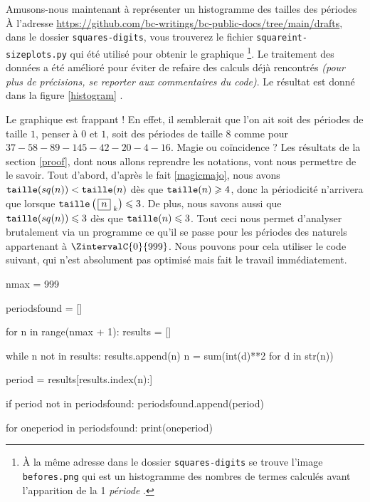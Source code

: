 \medskip

Amusons-nous maintenant à représenter un histogramme des tailles des \og périodes \fg{}
À l'adresse \url{https://github.com/bc-writings/bc-public-docs/tree/main/drafts}, dans le dossier \texttt{squares-digits}, vous trouverez le fichier \texttt{squareint-sizeplots.py} qui été utilisé pour obtenir le graphique
\footnote{
    À la même adresse dans le dossier \texttt{squares-digits} se trouve l'image \texttt{befores.png} qui est un histogramme des nombres de termes calculés avant l'apparition de la 1\iere{} \emph{\og période \fg{}}.
}.
Le traitement des données a été amélioré pour éviter de refaire des calculs déjà rencontrés \emph{(pour plus de précisions, se reporter aux commentaires du code)}.
Le résultat est donné dans la figure \ref{histogram} .



\medskip

Le graphique est frappant ! En effet, il semblerait que l'on ait soit des périodes de taille $1$, penser à $0$ et $1$, soit des périodes de taille $8$ comme pour $37 - 58 - 89 - 145 - 42 - 20 - 4 - 16$.
Magie ou coïncidence ? Les résultats de la section \ref{proof}, dont nous allons reprendre les notations, vont nous permettre de le savoir.
Tout d'abord,  d'après le fait \ref{magicmajo}, nous avons $\operatorname{\text{\normalfont\texttt{taille}}}(sq(n)) < \operatorname{\text{\normalfont\texttt{taille}}}(n)$ dès que $\operatorname{\text{\normalfont\texttt{taille}}}(n) \geqslant 4$, donc la périodicité n'arrivera que lorsque $\operatorname{\text{\normalfont\texttt{taille}}}\left( \, \fbox{$n$}_{\,\,k} \right) \leqslant 3$.
De plus, nous savons aussi que $\operatorname{\text{\normalfont\texttt{taille}}}(sq(n)) \leqslant 3$ dès que $\operatorname{\text{\normalfont\texttt{taille}}}(n) \leqslant 3$.
Tout ceci nous permet d'analyser brutalement via un programme ce qu'il se passe pour les périodes des naturels appartenant à $\ZintervalC{0}{999}$. Nous pouvons pour cela utiliser le code suivant, qui n'est absolument pas optimisé mais fait le travail immédiatement.


\newpage

\begin{rawcode}
nmax = 999

periodsfound = []

for n in range(nmax + 1):
    results = []

    while n not in results:
        results.append(n)
        n = sum(int(d)**2 for d in str(n))

    period = results[results.index(n):]

    if period not in periodsfound:
        periodsfound.append(period)

for oneperiod in periodsfound:
    print(oneperiod)
\end{rawcode}



